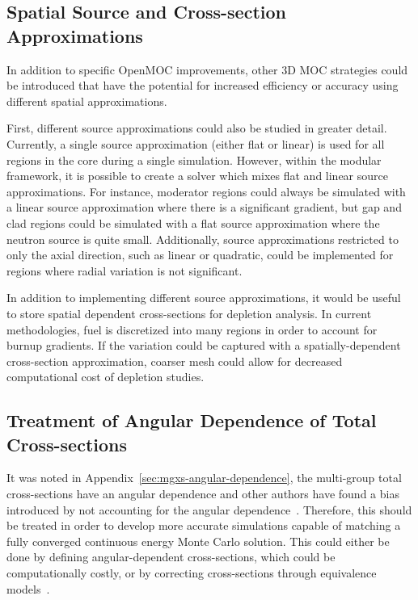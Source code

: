 \subsection{Spatial Source and Cross-section Approximations}

In addition to specific OpenMOC improvements, other 3D \ac{MOC} strategies could be introduced that have the potential for increased efficiency or accuracy using different spatial approximations.

First, different source approximations could also be studied in greater detail. Currently, a single source approximation (either flat or linear) is used for all regions in the core during a single simulation. However, within the modular framework, it is possible to create a solver which mixes flat and linear source approximations. For instance, moderator regions could always be simulated with a linear source approximation where there is a significant gradient, but gap and clad regions could be simulated with a flat source approximation where the neutron source is quite small. Additionally, source approximations restricted to only the axial direction, such as linear or quadratic, could be implemented for regions where radial variation is not significant.

In addition to implementing different source approximations, it would be useful to store spatial dependent cross-sections for depletion analysis.  In current methodologies, fuel is discretized into many regions in order to account for burnup gradients. If the variation could be captured with a spatially-dependent cross-section approximation, coarser mesh could allow for decreased computational cost of depletion studies.

\subsection{Treatment of Angular Dependence of Total Cross-sections}

It was noted in Appendix~\ref{sec:mgxs-angular-dependence}, the multi-group total cross-sections have an angular dependence and other authors have found a bias introduced by not accounting for the angular dependence~\cite{gibson-preprint}. Therefore, this should be treated in order to develop more accurate simulations capable of matching a fully converged continuous energy Monte Carlo solution. This could either be done by defining angular-dependent cross-sections, which could be computationally costly, or by correcting cross-sections through equivalence models~\cite{guillaume}.

